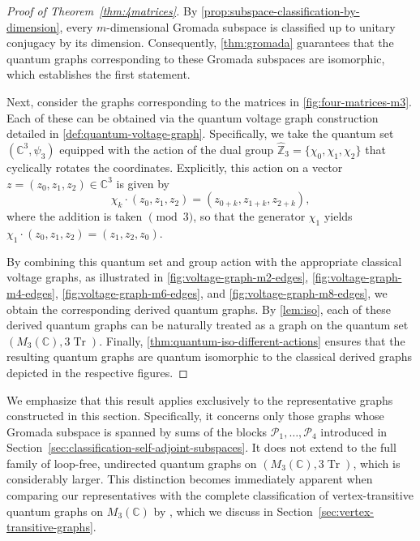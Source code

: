 \begin{proof}[Proof of Theorem~\ref{thm:4matrices}]
    By \ref{prop:subspace-classification-by-dimension}, every \( m
    \)-dimensional Gromada subspace is classified up to unitary
    conjugacy by its dimension. Consequently, \ref{thm:gromada}
    guarantees that the quantum graphs corresponding to these Gromada
    subspaces are isomorphic, which establishes the first statement.

    Next, consider the graphs corresponding to the matrices in
    \ref{fig:four-matrices-m3}. Each of these can be obtained via the
    quantum voltage graph construction detailed in
    \ref{def:quantum-voltage-graph}. Specifically, we take the
    quantum set \( (\mathbb{C}^3, \psi_3) \) equipped with the action
    of the dual group \( \widehat{\mathbb{Z}}_3 = \{ \chi_0, \chi_1,
    \chi_2 \} \) that cyclically rotates the coordinates. Explicitly,
    this action on a vector \( z = (z_0, z_1, z_2) \in \mathbb{C}^3
    \) is given by
    \[
        \chi_k \cdot (z_0, z_1, z_2) = (z_{0+k}, z_{1+k}, z_{2+k}),
    \]
    where the addition is taken \( \pmod 3 \), so that the generator
    \( \chi_1 \) yields \( \chi_1 \cdot (z_0,
    z_1, z_2) = (z_1, z_2, z_0) \).

    By combining this quantum set and group action with the
    appropriate classical voltage graphs, as illustrated in
    \ref{fig:voltage-graph-m2-edges},
    \ref{fig:voltage-graph-m4-edges},
    \ref{fig:voltage-graph-m6-edges}, and
    \ref{fig:voltage-graph-m8-edges}, we obtain the corresponding
    derived quantum graphs. By \ref{lem:iso}, each of these derived
    quantum graphs can be naturally treated as a graph on the quantum
    set \( (M_3 (\mathbb{C}), 3 \operatorname{Tr}) \). Finally,
    \ref{thm:quantum-iso-different-actions} ensures that the
    resulting quantum graphs are quantum isomorphic to the classical
    derived graphs depicted in the respective figures.
\end{proof}

\begin{remark}
    \label{rem:scope-representative-graphs}
    We emphasize that this result applies exclusively to the
    representative graphs constructed in this section. Specifically,
    it concerns only those graphs whose Gromada subspace is spanned
    by sums of the blocks \( \mathcal{P}_1,\ldots,\mathcal{P}_4 \)
    introduced in
    Section~\ref{sec:classification-self-adjoint-subspaces}. It does
    not extend to the full family of loop-free, undirected quantum
    graphs on \( (M_{3}(\mathbb{C}), 3\operatorname{Tr}) \), which is
    considerably larger. This distinction becomes immediately
    apparent when comparing our representatives with the complete
    classification of vertex-transitive quantum graphs on \(
    M_{3}(\mathbb{C}) \) by \textcite{hayes26}, which we discuss in
    Section~\ref{sec:vertex-transitive-graphs}.
\end{remark}

